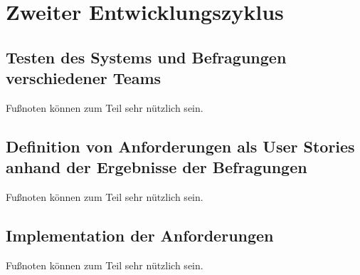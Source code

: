 \chapter{Zweiter Entwicklungszyklus}
\label{cha:zweiter_entwicklungszyklus}

\section{Testen des Systems und Befragungen verschiedener Teams} 
\label{sec:zweiter_testen_befragen}
Fußnoten können zum Teil sehr nützlich sein. 

\section{Definition von Anforderungen als User Stories anhand der Ergebnisse der Befragungen} 
\label{sec:zweiter_anforderungen_user_stories}
Fußnoten können zum Teil sehr nützlich sein. 

\section{Implementation der Anforderungen} 
\label{sec:zweiter_implementation}
Fußnoten können zum Teil sehr nützlich sein. 
